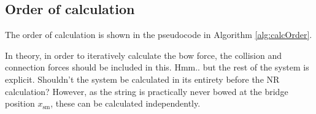 \documentclass[dvipsnames, pdftex]{article}
\def\SWcomment[#1]{\textcolor{Bittersweet}{#1}}
\begin{document}
\subsection{Order of calculation} 
The order of calculation is shown in the pseudocode in Algorithm \ref{alg:calcOrder}.
\begin{algorithm}[ht]
 \vspace{0.2cm}
 \caption{Pseudocode showing the order of calculations after initialisation.\label{alg:calcOrder}}
\end{algorithm}
%
In theory, in order to iteratively calculate the bow force, the collision and connection forces should be included in this. \SWcomment[Hmm.. but the rest of the system is explicit. Shouldn't the system be calculated in its entirety before the NR calculation?] However, as the string is practically never bowed at the bridge position $x_\text{sm}$, these can be calculated independently.
\end{document}
